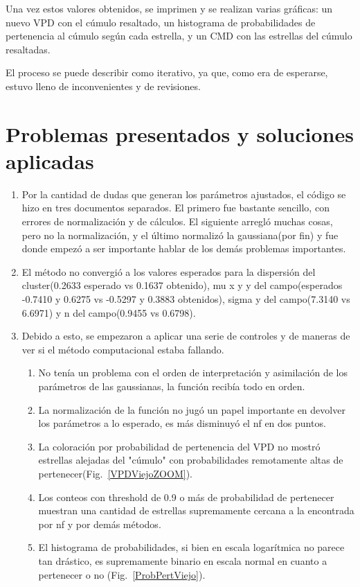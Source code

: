 \documentclass[10pt,twocolumn]{article}
\begin{document}
Una vez estos valores obtenidos, se imprimen y se realizan varias gráficas: un nuevo VPD con el cúmulo resaltado, 
un histograma de probabilidades de pertenencia al cúmulo según cada estrella, y un CMD con las estrellas del 
cúmulo resaltadas. 

El proceso se puede describir como iterativo, ya que, como era de esperarse, estuvo lleno de inconvenientes y
de revisiones.

\section{Problemas presentados y soluciones aplicadas}

\begin{enumerate}
  \item Por la cantidad de dudas que generan los parámetros ajustados, el código se hizo en tres documentos separados. 
  El primero fue bastante sencillo, con errores de normalización y de cálculos. El siguiente arregló muchas cosas, pero no la normalización, 
  y el último normalizó la gaussiana(por fin) y fue donde empezó a ser importante hablar de los demás problemas importantes.
  \item El método no convergió a los valores esperados para la dispersión del cluster(0.2633 esperado vs 0.1637 obtenido),
   mu x y y del campo(esperados -0.7410 y 0.6275 vs -0.5297 y 0.3883 obtenidos), sigma y del campo(7.3140 vs 6.6971) y n del campo(0.9455 vs 0.6798).
   \item Debido a esto, se empezaron a aplicar una serie de controles y de maneras de ver si el método computacional estaba fallando. 
   \begin{enumerate}
    \item No tenía un problema con el orden de interpretación y asimilación de los parámetros de las gaussianas, la función recibía todo en orden.
    \item La normalización de la función no jugó un papel importante en devolver los parámetros a lo esperado, es más disminuyó el nf en dos puntos.
    \item La coloración por probabilidad de pertenencia del VPD no mostró estrellas alejadas del "cúmulo" con probabilidades remotamente altas de pertenecer(Fig.~\ref{VPDViejoZOOM}). 
    \item Los conteos con threshold de 0.9 o más de probabilidad de pertenecer muestran una cantidad de estrellas supremamente cercana a la encontrada por nf y por demás métodos.
    \item El histograma de probabilidades, si bien en escala logarítmica no parece tan drástico, es supremamente binario en escala normal en cuanto a pertenecer o no (Fig.~\ref{ProbPertViejo}).

\end{enumerate}
\end{enumerate}
\end{document}
